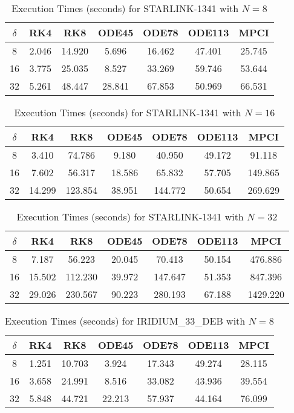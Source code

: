 
\begin{table}[htbp]
\centering
\begin{tabular}{|c|c|c|c|c|c|c|}
\hline
$\delta$ & RK4 & RK8 & ODE45 & ODE78 & ODE113 & MPCI \\
\hline
8 & 2.046 & 14.920 & 5.696 & 16.462 & 47.401 & 25.745 \\
\hline
16 & 3.775 & 25.035 & 8.527 & 33.269 & 59.746 & 53.644 \\
\hline
32 & 5.261 & 48.447 & 28.841 & 67.853 & 50.969 & 66.531 \\
\hline
\end{tabular}
\caption{Execution Times (seconds) for STARLINK-1341 with $N=8$}
\label{tab:starlink_1341_N8}
\end{table}

\begin{table}[htbp]
\centering
\begin{tabular}{|c|c|c|c|c|c|c|}
\hline
$\delta$ & RK4 & RK8 & ODE45 & ODE78 & ODE113 & MPCI \\
\hline
8 & 3.410 & 74.786 & 9.180 & 40.950 & 49.172 & 91.118 \\
\hline
16 & 7.602 & 56.317 & 18.586 & 65.832 & 57.705 & 149.865 \\
\hline
32 & 14.299 & 123.854 & 38.951 & 144.772 & 50.654 & 269.629 \\
\hline
\end{tabular}
\caption{Execution Times (seconds) for STARLINK-1341 with $N=16$}
\label{tab:starlink_1341_N16}
\end{table}

\begin{table}[htbp]
\centering
\begin{tabular}{|c|c|c|c|c|c|c|}
\hline
$\delta$ & RK4 & RK8 & ODE45 & ODE78 & ODE113 & MPCI \\
\hline
8 & 7.187 & 56.223 & 20.045 & 70.413 & 50.154 & 476.886 \\
\hline
16 & 15.502 & 112.230 & 39.972 & 147.647 & 51.353 & 847.396 \\
\hline
32 & 29.026 & 230.567 & 90.223 & 280.193 & 67.188 & 1429.220 \\
\hline
\end{tabular}
\caption{Execution Times (seconds) for STARLINK-1341 with $N=32$}
\label{tab:starlink_1341_N32}
\end{table}

\begin{table}[htbp]
\centering
\begin{tabular}{|c|c|c|c|c|c|c|}
\hline
$\delta$ & RK4 & RK8 & ODE45 & ODE78 & ODE113 & MPCI \\
\hline
8 & 1.251 & 10.703 & 3.924 & 17.343 & 49.274 & 28.115 \\
\hline
16 & 3.658 & 24.991 & 8.516 & 33.082 & 43.936 & 39.554 \\
\hline
32 & 5.848 & 44.721 & 22.213 & 57.937 & 44.164 & 76.099 \\
\hline
\end{tabular}
\caption{Execution Times (seconds) for IRIDIUM\_33\_DEB with $N=8$}
\label{tab:iridium_33_deb_N8}
\end{table}

